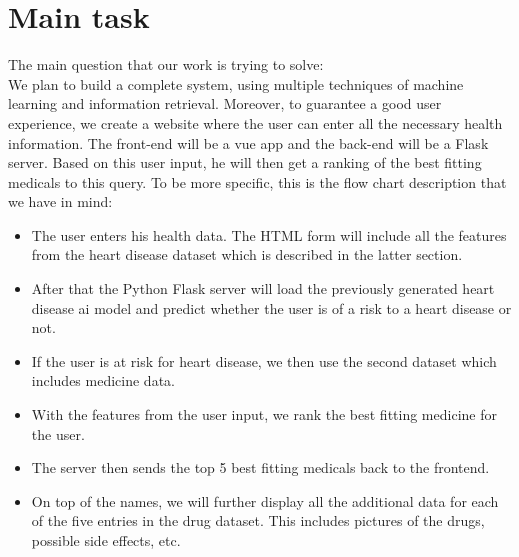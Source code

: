 \documentclass{article}
\begin{document}
\section{Main task}
The main question that our work is trying to solve:\\
We plan to build a complete system, using multiple techniques of machine learning and information retrieval. Moreover, to guarantee a good user experience, 
we create a website where the user can enter all the necessary health information. The front-end will be a vue app and the back-end will be a Flask server.
Based on this user input, he will then get a ranking of the best fitting medicals to this query.
To be more specific, this is the flow chart description that we have in mind:
\begin{itemize}
    \item The user enters his health data. The HTML form will include all the features from the heart disease dataset which is described in the latter section.
    \item After that the Python Flask server will load the previously generated heart disease ai model and predict whether the user is of a risk to a heart disease or not.
    \item If the user is at risk for heart disease, we then use the second dataset which includes medicine data.
    \item With the features from the user input, we rank the best fitting medicine for the user.
    \item The server then sends the top 5 best fitting medicals back to the frontend.
    \item On top of the names, we will further display all the additional data for each of the five entries in the drug dataset. This includes pictures of the drugs, possible side effects, etc.
\end{itemize} 

\end{document}
